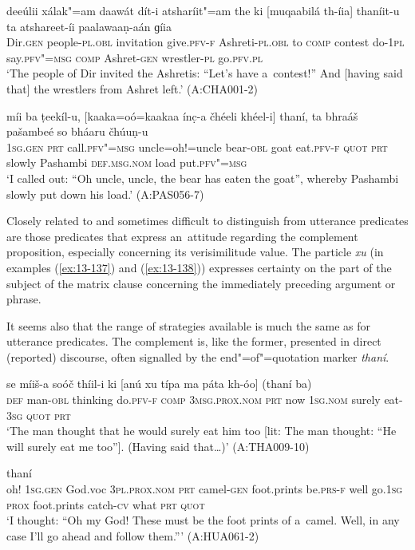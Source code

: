 \begin{exe}
\ex
\label{ex:13-135}
\gll deeúlii xálak"=am daawát dít-i  atsharíit"=am the ki [muqaabilá
  th-íia]  thaníit-u ta atshareet-íi paalawaaṇ-aán ɡíia \\
Dir.\textsc{gen} people-\textsc{pl.obl} invitation give.\textsc{pfv-f}  Ashreti-\textsc{pl.obl} to \textsc{comp} contest do-\textsc{1pl}  say.\textsc{pfv"=msg} \textsc{comp} Ashret-\textsc{gen} wrestler-\textsc{pl} go.\textsc{pfv.pl} \\
\glt `The people of Dir invited the Ashretis: ``Let's have a~contest!'' And [having said that] the wrestlers from Ashret left.' (A:CHA001-2)

\ex
\label{ex:13-136}
\gll míi ba ṭeekíl-u, [kaaka=oó=kaakaa ínc̣-a čhéeli  khéel-i]
thaní, ta bhraáš pašambeé so  bháaru čhúuṇ-u \\
\textsc{1sg.gen} \textsc{prt} call.\textsc{pfv"=msg} uncle=oh!=uncle bear-\textsc{obl} goat  eat.\textsc{pfv-f} \textsc{quot } \textsc{prt} slowly Pashambi \textsc{def.msg.nom} load put.\textsc{pfv"=msg}  \\
\glt `I called out: ``Oh uncle, uncle, the bear has eaten the goat'', whereby Pashambi slowly put down his load.' (A:PAS056-7) 
\end{exe}

 Closely related to and sometimes difficult to distinguish from utterance predicates are those predicates that express an~attitude regarding the complement proposition, especially concerning its verisimilitude value. The particle \textit{xu} (in examples (\ref{ex:13-137}) and (\ref{ex:13-138})) expresses certainty on the part of the subject of the matrix clause concerning the immediately preceding argument or phrase.


It seems also that the range of strategies available is much the same as for utterance predicates. The complement is, like the former, presented in direct (reported) discourse, often signalled by the end"=of"=quotation marker \textit{thaní}. 

\begin{exe}
\ex
\label{ex:13-137}
\gll se míiš-a soóč thíil-i ki [anú xu  típa ma páta kh-óo] (thaní ba) \\
\textsc{def } man-\textsc{obl} thinking do.\textsc{pfv-f} \textsc{comp} \textsc{3msg.prox.nom} \textsc{prt}  now \textsc{1sg.nom} surely eat-\textsc{3sg} \textsc{quot} \textsc{prt} \\
\glt `The man thought that he would surely eat him too [lit: The man thought: ``He will surely eat me too'']. (Having said that{\ldots})' (A:THA009-10)

\ex
\label{ex:13-138}
 thaní \\
oh! \textsc{1sg.gen} God.voc \textsc{3pl.prox.nom} \textsc{prt} camel-\textsc{gen}  foot.prints be.\textsc{prs-f} well go.\textsc{1sg} \textsc{prox} foot.prints catch-\textsc{cv} what \textsc{prt} \textsc{quot } \\
\glt `I thought: ``Oh my God! These must be the foot prints of a~camel. Well, in any case I'll go ahead and follow them.''' (A:HUA061-2) 
\end{exe}


